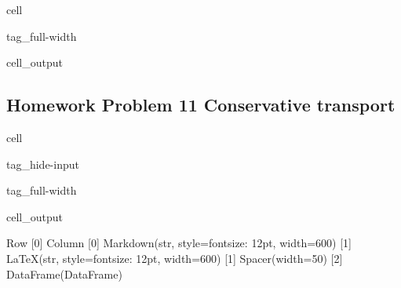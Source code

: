 \documentclass[letterpaper,10pt,english]{jupyterBook}
\begin{document}
\begin{sphinxuseclass}{cell}
\begin{sphinxuseclass}{tag_full-width}
\begin{sphinxVerbatimOutput}
\begin{sphinxuseclass}{cell_output}
\end{sphinxuseclass}\end{sphinxVerbatimOutput}

\end{sphinxuseclass}
\end{sphinxuseclass}

\subsection{Homework Problem 11 \sphinxhyphen{} Conservative transport}
\label{\detokenize{content/tutorials/T9/tutorial_09:homework-problem-11-conservative-transport}}
\begin{sphinxuseclass}{cell}
\begin{sphinxuseclass}{tag_hide-input}
\begin{sphinxuseclass}{tag_full-width}\begin{sphinxVerbatimOutput}

\begin{sphinxuseclass}{cell_output}
\begin{sphinxVerbatim}[commandchars=\\\{\}]
Row
    [0] Column
        [0] Markdown(str, style=\PYGZob{}\PYGZsq{}font\PYGZhy{}size\PYGZsq{}: \PYGZsq{}12pt\PYGZsq{}\PYGZcb{}, width=600)
        [1] LaTeX(str, style=\PYGZob{}\PYGZsq{}font\PYGZhy{}size\PYGZsq{}: \PYGZsq{}12pt\PYGZsq{}\PYGZcb{}, width=600)
    [1] Spacer(width=50)
    [2] DataFrame(DataFrame)
\end{sphinxVerbatim}

\end{sphinxuseclass}\end{sphinxVerbatimOutput}

\end{sphinxuseclass}
\end{sphinxuseclass}
\end{sphinxuseclass}
\end{document}
